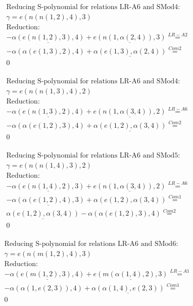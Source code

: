 \documentclass[11pt]{amsart}
\begin{document}
\begin{align*} 
& \text{Reducing S-polynomial for relations LR-A6 and SMod4:} \\ 
& \gamma = e(n(n(1,2),4),3) \\ 
& \text{Reduction}: \\& - \underline{\alpha(e(n(1,2),3),4)} + \underline{e(n(1,\alpha(2,4)),3)} \stackrel{ LR-A2 }{=}  \\ 
& - \alpha(\alpha(e(1,3),2),4) + \underline{\alpha(e(1,3),\alpha(2,4))} \stackrel{ Com2 }{=}  \\ 
&0\\ 
\end{align*} 
 
\begin{align*} 
& \text{Reducing S-polynomial for relations LR-A6 and SMod4:} \\ 
& \gamma = e(n(n(1,3),4),2) \\ 
& \text{Reduction}: \\& - \underline{\alpha(e(n(1,3),2),4)} + \underline{e(n(1,\alpha(3,4)),2)} \stackrel{ LR-A6 }{=}  \\ 
& - \alpha(\alpha(e(1,2),3),4) + \underline{\alpha(e(1,2),\alpha(3,4))} \stackrel{ Com2 }{=}  \\ 
&0\\ 
\end{align*} 
 
\begin{align*} 
& \text{Reducing S-polynomial for relations LR-A6 and SMod5:} \\ 
& \gamma = e(n(n(1,4),3),2) \\ 
& \text{Reduction}: \\& - \underline{\alpha(e(n(1,4),2),3)} + \underline{e(n(1,\alpha(3,4)),2)} \stackrel{ LR-A6 }{=}  \\ 
& - \underline{\alpha(\alpha(e(1,2),4),3)} + \alpha(e(1,2),\alpha(3,4)) \stackrel{ Com1 }{=}  \\ 
&\underline{\alpha(e(1,2),\alpha(3,4))} - \alpha(\alpha(e(1,2),3),4) \stackrel{ Com2 }{=}  \\ 
&0\\ 
\end{align*} 
 
\begin{align*} 
& \text{Reducing S-polynomial for relations LR-A6 and SMod6:} \\ 
& \gamma = e(n(m(1,2),4),3) \\ 
& \text{Reduction}: \\& - \underline{\alpha(e(m(1,2),3),4)} + \underline{e(m(\alpha(1,4),2),3)} \stackrel{ LR-A1 }{=}  \\ 
& - \alpha(\alpha(1,e(2,3)),4) + \underline{\alpha(\alpha(1,4),e(2,3))} \stackrel{ Com1 }{=}  \\ 
&0\\ 
\end{align*} 
 
\end{document}

